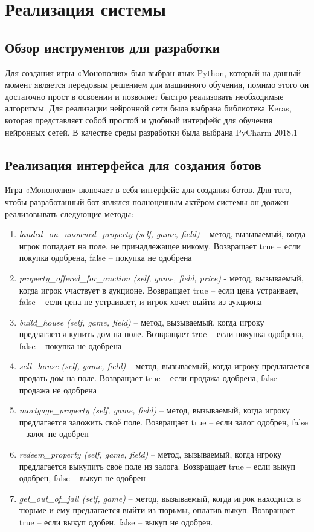 \newpage
\section{Реализация системы}
\subsection{Обзор инструментов для разработки}
Для создания игры «Монополия» был выбран язык Python, который на данный момент является передовым решением для машинного обучения, помимо этого он достаточно прост в освоении и позволяет быстро реализовать необходимые алгоритмы. Для реализации нейронной сети была выбрана библиотека Keras, которая представляет собой простой и удобный интерфейс для обучения нейронных сетей. В качестве среды разработки была выбрана PyCharm 2018.1
\subsection{Реализация интерфейса для создания ботов}
Игра «Монополия» включает в себя интерфейс для создания ботов. Для того, чтобы разработанный бот являлся полноценным актёром системы он должен реализовывать следующие методы:
\begin{enumerate}
    \item \textit{landed\_on\_unowned\_property (self, game, field)} – метод, вызываемый, когда игрок попадает на поле, не принадлежащее никому. Возвращает true – если покупка одобрена, false – покупка не одобрена
    \item \textit{property\_offered\_for\_auction (self, game, field, price)} - метод, вызываемый, когда игрок участвует в аукционе. Возвращает true – если цена устраивает, false – если цена не устраивает, и игрок хочет выйти из аукциона
    \item \textit{build\_house (self, game, field)} – метод, вызываемый, когда игроку предлагается купить дом на поле. Возвращает true – если покупка одобрена, false – покупка не одобрена
    \item \textit{sell\_house (self, game, field)} – метод, вызываемый, когда игроку предлагается продать дом на поле. Возвращает true – если продажа одобрена, false – продажа не одобрена
    \item \textit{mortgage\_property (self, game, field)} – метод, вызываемый, когда игроку предлагается заложить своё поле. Возвращает true – если залог одобрен, false – залог не одобрен
    \item \textit{redeem\_property (self, game, field)} – метод, вызываемый, когда игроку предлагается выкупить своё поле из залога. Возвращает true – если выкуп одобрен, false – выкуп не одобрен
    \item \textit{get\_out\_of\_jail (self, game)} – метод, вызываемый, когда игрок находится в тюрьме и ему предлагается выйти из тюрьмы, оплатив выкуп. Возвращает true – если выкуп одобен, false – выкуп не одобрен.
\end{enumerate}
